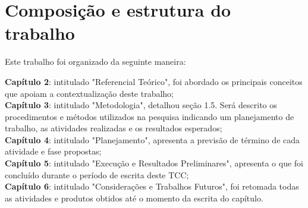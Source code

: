 

%     


\section{Composição e estrutura do trabalho}
Este trabalho foi organizado da seguinte maneira:

\textbf{Capítulo 2}: intitulado "Referencial Teórico", foi abordado os principais conceitos que apoiam a contextualização deste trabalho;\\

\textbf{Capítulo 3}: intitulado "Metodologia", detalhou seção 1.5. Será descrito os procedimentos e métodos utilizados na pesquisa indicando um planejamento de trabalho, as atividades realizadas e os resultados esperados;\\

\textbf{Capítulo 4}: intitulado "Planejamento", apresenta a previsão de término de cada atividade e fase propostas;\\

\textbf{Capítulo 5}: intitulado "Execução e Resultados Preliminares", apresenta o que foi concluído durante o período de escrita deste TCC;\\

\textbf{Capítulo 6}: intitulado "Considerações e Trabalhos Futuros", foi retomada todas as atividades e produtos obtidos até o momento da escrita do capítulo.
